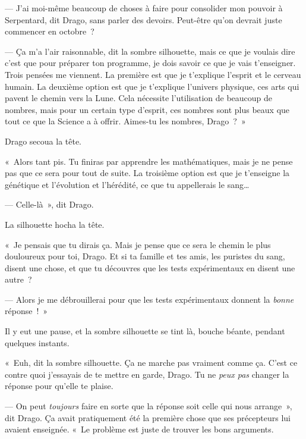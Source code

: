 --- J'ai moi-même beaucoup de choses à faire pour consolider mon pouvoir à Serpentard, dit Drago, sans parler des devoirs. Peut-être qu'on devrait juste commencer en octobre~?

--- Ça m'a l'air raisonnable, dit la sombre silhouette, mais ce que je voulais dire c'est que pour préparer ton programme, je dois savoir ce que je vais t'enseigner. Trois pensées me viennent. La première est que je t'explique l'esprit et le cerveau humain. La deuxième option est que je t'explique l'univers physique, ces arts qui pavent le chemin vers la Lune. Cela nécessite l'utilisation de beaucoup de nombres, mais pour un certain type d'esprit, ces nombres sont plus beaux que tout ce que la Science a à offrir. Aimes-tu les nombres, Drago~?~»

Drago secoua la tête.

«~Alors tant pis. Tu finiras par apprendre les mathématiques, mais je ne pense pas que ce sera pour tout de suite. La troisième option est que je t'enseigne la génétique et l'évolution et l'hérédité, ce que tu appellerais le sang…

--- Celle-là~», dit Drago.

La silhouette hocha la tête.

«~Je pensais que tu dirais ça. Mais je pense que ce sera le chemin le plus douloureux pour toi, Drago. Et si ta famille et tes amis, les puristes du sang, disent une chose, et que tu découvres que les tests expérimentaux en disent une autre~?

--- Alors je me débrouillerai pour que les tests expérimentaux donnent la \emph{bonne} réponse~!~»

Il y eut une pause, et la sombre silhouette se tint là, bouche béante, pendant quelques instants.

«~Euh, dit la sombre silhouette. Ça ne marche pas vraiment comme ça. C'est ce contre quoi j'essayais de te mettre en garde, Drago. Tu ne \emph{peux pas} changer la réponse pour qu'elle te plaise.

--- On peut \emph{toujours} faire en sorte que la réponse soit celle qui nous arrange~», dit Drago. Ça avait pratiquement été la première chose que ses précepteurs lui avaient enseignée. «~Le problème est juste de trouver les bons arguments.

